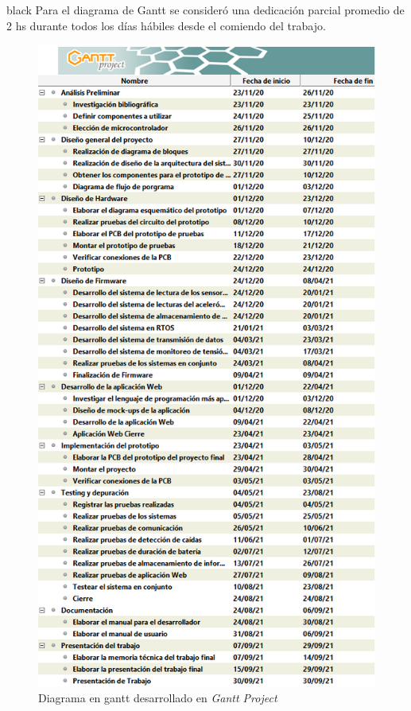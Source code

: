 \documentclass[11pt]{charter}
\begin{document}
\begin{consigna}{black}
Para el diagrama de Gantt se consideró una dedicación parcial promedio de 2 hs durante todos los días hábiles desde el comiendo del trabajo.
\begin{figure}[htpb]

\centering 
\includegraphics[width=.8\textwidth]{./Figuras/DiagramaGantt_Nombres.png}
\caption{Diagrama en gantt desarrollado en \textit{Gantt Project}}
\label{fig:gantt1}
\end{figure}


\end{consigna}
\end{document}
